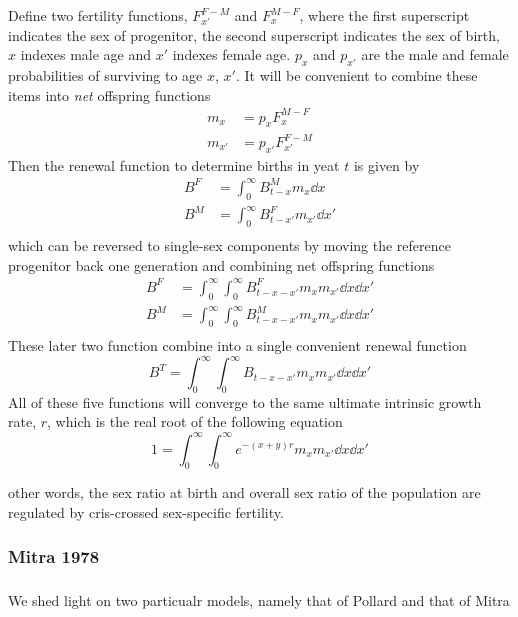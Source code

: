 Define two fertility functions, $F_{x'}^{F-M}$ and $F_x^{M-F}$, where the first
superscript indicates the sex of progenitor, the second superscript indicates
the sex of birth, $x$ indexes male age and $x'$ indexes female age. $p_x$ and
$p_{x'}$ are the male and female probabilities of surviving to age $x$, $x'$. It
will be convenient to combine these items into \textit{net} offspring functions
\begin{align}
m_x &= p_xF_x^{M-F}\\
m_{x'} &= p_{x'}F_{x'}^{F-M}
\end{align}
Then the renewal function to determine births in yeat $t$ is given by
\begin{align}
B^F &= \int_0^\infty B^M_{t-x}m_x \dd x\\
B^M &= \int_0^\infty B^F_{t-x'}m_{x'} \dd x'\\
\end{align}
which can be reversed to single-sex components by moving the reference
progenitor back one generation and combining net offspring functions
\begin{align}
B^F &= \int_0^\infty \int_0^\infty B^F_{t-x-x'} m_xm_{x'}\dd x \dd x'\\
B^M &= \int_0^\infty \int_0^\infty B^M_{t-x-x'} m_xm_{x'}\dd x \dd x'\\
\end{align}
These later two function combine into a single convenient renewal function
\begin{equation}
B^T = \int_0^\infty \int_0^\infty B_{t-x-x'}m_xm_{x'}\dd x \dd x'
\end{equation}
All of these five functions will converge to the same ultimate intrinsic growth
rate, $r$, which is the real root of the following equation 
\begin{equation}
1 = \int_0^\infty \int_0^\infty e^{-(x+y)r}m_xm_{x'}\dd x \dd x'
\end{equation}

other words, the sex ratio at birth and overall sex ratio of the population are
regulated by cris-crossed sex-specific fertility.


\subsubsection{Mitra 1978}

\subsubsection{}


We shed light on two
particualr models, namely that of Pollard and that of Mitra










